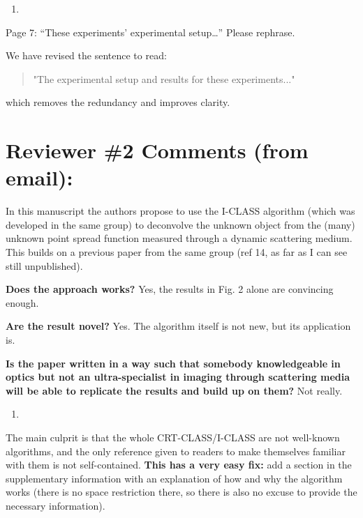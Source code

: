 \documentclass[12pt]{article}
\newenvironment{solved_reviewercomment}
    {\begin{tcolorbox}[width=\linewidth,colback=gray!5,colframe=solved_commentcolor!50,title=Reviewer Comment,left=5pt,right=5pt]}
    {\end{tcolorbox}}
\newenvironment{finished_ourresponse}
    {\begin{tcolorbox}[width=\linewidth,breakable,enhanced,colback=gray!5,colframe=finished_responsecolor!50,title=Response,left=5pt,right=5pt]}
    {\end{tcolorbox}}
\begin{document}
\begin{enumerate}[label=\arabic*., resume]
\item \leavevmode
\end{enumerate}
\vspace{-1em}
\begin{solved_reviewercomment}
    Page 7: “These experiments’ experimental setup…” Please rephrase.
\end{solved_reviewercomment}

\begin{finished_ourresponse}
    
    We have revised the sentence to read: 
    \begin{quote}
        "The experimental setup and results for these experiments..." 
    \end{quote}
    which removes the redundancy and improves clarity.
\end{finished_ourresponse}


\newpage

\section{Reviewer \#2 Comments (from email):}

In this manuscript the authors propose to use the I-CLASS algorithm (which was developed in the same group) to deconvolve the unknown object from the (many) unknown point spread function measured through a dynamic scattering medium. This builds on a previous paper from the same group (ref 14, as far as I can see still unpublished).

\textbf{Does the approach works?} Yes, the results in Fig. 2 alone are convincing enough.

\textbf{Are the result novel?} Yes. The algorithm itself is not new, but its application is.

\textbf{Is the paper written in a way such that somebody knowledgeable in optics but not an ultra-specialist in imaging through scattering media will be able to replicate the results and build up on them?} Not really. 

\begin{enumerate}[label=\arabic*.]
\item \leavevmode
\end{enumerate}
\vspace{-1em}
\begin{solved_reviewercomment}
    The main culprit is that the whole CRT-CLASS/I-CLASS are not well-known algorithms, and the only reference given to readers to make themselves familiar with them is not self-contained. \textbf{This has a very easy fix:} add a section in the supplementary information with an explanation of how and why the algorithm works (there is no space restriction there, so there is also no excuse to provide the necessary information).
\end{solved_reviewercomment}
\end{document}
